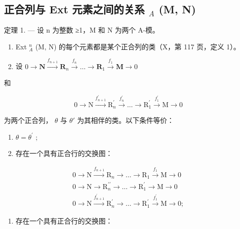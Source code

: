 \subsection{\texorpdfstring{正合列与 Ext 元素之间的关系 \(_{A}\) (M, N)}{正合列与 Ext 元素之间的关系 \_\{A\} (M, N)}}

定理 1. --- 设 n 为整数 ≥1，M 和 N 为两个 A-模。

\begin{enumerate}
\def\labelenumi{\alph{enumi})}
\item
  Ext \(_{A}^{n}\) (M, N) 的每个元素都是某个正合列的类（X，第 117 页，定义 1）。
\item
  设 \(0 \to \mathbf{N} \xrightarrow{f_{n+1}} \mathbf{R}_n \xrightarrow{f_n} \ldots \to \mathbf{R}_1 \xrightarrow{f_1} \mathbf{M} \to 0\)
\end{enumerate}

和

\[
0 \rightarrow \mathrm{N} \xrightarrow {f _ {n + 1} ^ {\prime}} \mathrm{R} _ {n} ^ {\prime} \xrightarrow {f _ {n} ^ {\prime}} \dots \rightarrow \mathrm{R} _ {1} ^ {\prime} \xrightarrow {f _ {1} ^ {\prime}} \mathrm{M} \rightarrow 0
\]

为两个正合列， \(\theta\) 与 \(\theta'\) 为其相伴的类。以下条件等价：

\begin{enumerate}
\def\labelenumi{(\roman{enumi})}
\item
  \(\theta = \theta^{\prime}\) ;
\item
  存在一个具有正合行的交换图：
\end{enumerate}

\[
\begin{array}{c} 0 \longrightarrow \mathrm{N} \xrightarrow {f _ {n + 1}} \mathrm{R} _ {n} \longrightarrow \dots \longrightarrow \mathrm{R} _ {1} \xrightarrow {f _ {1}} \mathrm{M} \longrightarrow 0 \\ 0 \longrightarrow \mathrm{N} \longrightarrow \mathrm{R} _ {n} ^ {\prime \prime} \longrightarrow \dots \longrightarrow \mathrm{R} _ {1} ^ {\prime} \longrightarrow \mathrm{M} \longrightarrow 0 \\ 0 \longrightarrow \mathrm{N} \xrightarrow {f _ {n + 1} ^ {\prime}} \mathrm{R} _ {n} ^ {\prime} \longrightarrow \dots \longrightarrow \mathrm{R} _ {1} ^ {\prime} \xrightarrow {f _ {1} ^ {\prime}} \mathrm{M} \longrightarrow 0; \end{array}
\]

\begin{enumerate}
\def\labelenumi{(\roman{enumi})}
\setcounter{enumi}{2}
\tightlist
\item
  存在一个具有正合行的交换图：
\end{enumerate}

